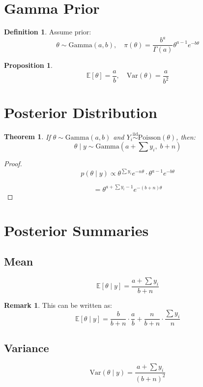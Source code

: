 \documentclass[12pt,oneside]{book}
\numberwithin{equation}{section}
\theoremstyle{definition}
\newtheorem{definition}{Definition}[section]
\newtheorem{remark}{Remark}[section]
\theoremstyle{plain}
\newtheorem{theorem}{Theorem}[section]
\newtheorem{proposition}{Proposition}[section]
\theoremstyle{remark}
\newcommand{\E}{\mathbb{E}}
\newcommand{\Var}{\mathrm{Var}}
\newcommand{\iid}{\overset{\text{iid}}{\sim}}
\newcommand{\Pois}{\mathrm{Poisson}}
\newcommand{\Gam}{\mathrm{Gamma}}
\begin{document}
\section{Gamma Prior}

\begin{definition}
Assume prior:
$$
\theta \sim \Gam(a,b), \quad
\pi(\theta) = \frac{b^a}{\Gamma(a)} \theta^{a-1} e^{-b\theta}
$$
\end{definition}

\begin{proposition}
$$
\E[\theta] = \frac{a}{b}, \quad \Var(\theta) = \frac{a}{b^2}
$$
\end{proposition}

\section{Posterior Distribution}

\begin{theorem}
If $\theta \sim \Gam(a,b)$ and $Y_i \iid \Pois(\theta)$, then:
$$
\theta \mid y \sim \Gam\left(a + \sum y_i,\; b + n\right)
$$
\end{theorem}

\begin{proof}
$$
p(\theta \mid y)
\propto \theta^{\sum y_i} e^{-n\theta} \cdot \theta^{a-1} e^{-b\theta}
$$

$$
= \theta^{a+\sum y_i -1} e^{-(b+n)\theta}
$$
\end{proof}

\section{Posterior Summaries}

\subsection{Mean}

$$
\E[\theta \mid y]
= \frac{a + \sum y_i}{b + n}
$$

\begin{remark}
This can be written as:
$$
\E[\theta \mid y]
=
\frac{b}{b+n}\cdot \frac{a}{b}
+
\frac{n}{b+n}\cdot \frac{\sum y_i}{n}
$$
\end{remark}

\subsection{Variance}

$$
\Var(\theta \mid y)
=
\frac{a + \sum y_i}{(b+n)^2}
$$
\end{document}
